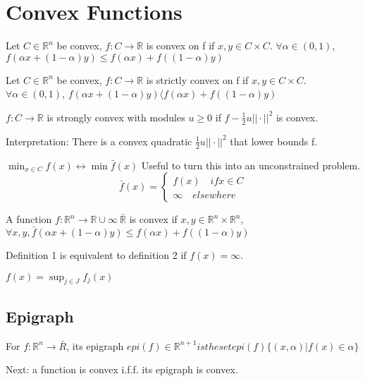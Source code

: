 \documentclass[11pt]{book} %
\def\R{\mathbb{R}}
\begin{document}
\section{Convex Functions}
\begin{definition}
Let $C \in \R^n$ be convex, $f:C \to \R$ is convex on f if $x,y \in C \times C$. $\forall \alpha \in (0,1)$, $f(\alpha x + (1-\alpha) y) \le f(\alpha x) + f((1-\alpha) y)$
\end{definition}

\begin{definition}
Let $C \in \R^n$ be convex, $f:C \to \R$ is strictly convex on f if $x,y \in C \times C$. $\forall \alpha \in (0,1)$, $f(\alpha x + (1-\alpha) y) \langle f(\alpha x) + f((1-\alpha) y)$
\end{definition}

\begin{definition}
$f:C \to \R$ is strongly convex with modules $u \ge 0$ if $f - \frac{1}{2}u || \cdot ||^2$ is convex.
\end{definition}
Interpretation: There is a convex quadratic $\frac{1}{2}u || \cdot ||^2$ that lower bounds f.
\begin{example}
$\min_{x \in C} f(x) \leftrightarrow \min \bar{f}(x)$
Useful to turn this into an unconstrained problem. \\
$$\bar{f}(x) = \begin{cases}
f(x) \quad if x \in C \\
\infty \quad  elsewhere
\end{cases}$$
\end{example}
\begin{definition}
A function $f : \R^n \to \R \cup \infty \ \bar{\R}$ is convex if $x,y \in \R^n \times \R^n$, $\forall x,y , \bar{f}(\alpha x + (1-\alpha) y) \le f(\alpha x) + f((1-\alpha) y)$
\end{definition}
Definition 1 is equivalent to definition 2 if $f(x) = \infty$.
\begin{example}
$f(x) = \sup_{j \in J} f_j(x)$
\end{example}

\subsection{Epigraph} 
\begin{definition}[Epigraph]
For $f: \R^n \rightarrow \bar{R}$, its epigraph $epi(f) \in \R^{n+1} is the set epi(f) \{ (x,\alpha) | f(x) \in \alpha \}$
\end{definition}
Next: a function is convex i.f.f. its epigraph is convex.
\end{document}

